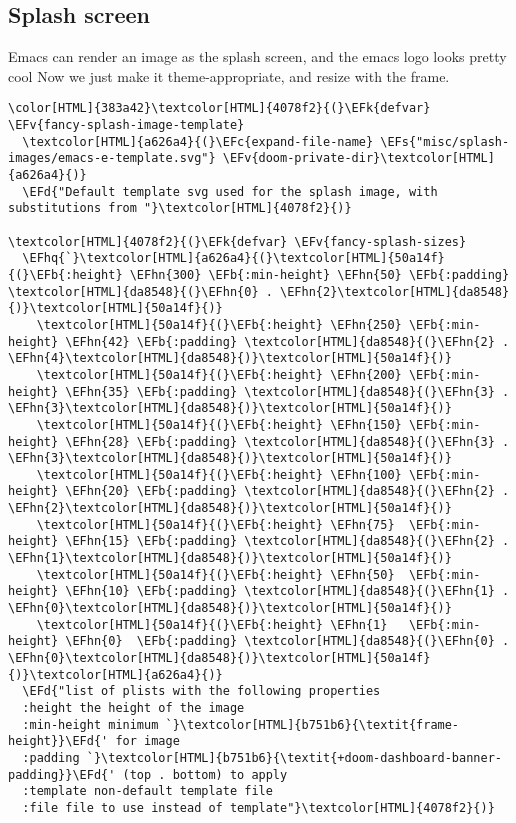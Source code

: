 \documentclass{scrartcl}
\newcommand{\EFk}[1]{\textcolor{EFk}{#1}} %
\newcommand{\EFd}[1]{\textcolor{EFd}{\textit{#1}}} %
\newcommand{\EFs}[1]{\textcolor{EFs}{#1}} %
\newcommand{\EFb}[1]{\textcolor{EFb}{#1}} %
\newcommand{\EFc}[1]{\textcolor{EFc}{#1}} %
\newcommand{\EFv}[1]{\textcolor{EFv}{#1}} %
\newcommand{\EFhn}[1]{\textcolor{EFhn}{\textbf{#1}}} %
\newcommand{\EFhq}[1]{\textcolor{EFhq}{#1}} %
\begin{document}
\subsection{Splash screen}
\label{sec:orgf0f228f}
Emacs can render an image as the splash screen, and the emacs logo looks pretty cool
Now we just make it theme-appropriate, and resize with the frame.
\begin{Code}
\begin{Verbatim}[]
\color[HTML]{383a42}\textcolor[HTML]{4078f2}{(}\EFk{defvar} \EFv{fancy-splash-image-template}
  \textcolor[HTML]{a626a4}{(}\EFc{expand-file-name} \EFs{"misc/splash-images/emacs-e-template.svg"} \EFv{doom-private-dir}\textcolor[HTML]{a626a4}{)}
  \EFd{"Default template svg used for the splash image, with substitutions from "}\textcolor[HTML]{4078f2}{)}

\textcolor[HTML]{4078f2}{(}\EFk{defvar} \EFv{fancy-splash-sizes}
  \EFhq{`}\textcolor[HTML]{a626a4}{(}\textcolor[HTML]{50a14f}{(}\EFb{:height} \EFhn{300} \EFb{:min-height} \EFhn{50} \EFb{:padding} \textcolor[HTML]{da8548}{(}\EFhn{0} . \EFhn{2}\textcolor[HTML]{da8548}{)}\textcolor[HTML]{50a14f}{)}
    \textcolor[HTML]{50a14f}{(}\EFb{:height} \EFhn{250} \EFb{:min-height} \EFhn{42} \EFb{:padding} \textcolor[HTML]{da8548}{(}\EFhn{2} . \EFhn{4}\textcolor[HTML]{da8548}{)}\textcolor[HTML]{50a14f}{)}
    \textcolor[HTML]{50a14f}{(}\EFb{:height} \EFhn{200} \EFb{:min-height} \EFhn{35} \EFb{:padding} \textcolor[HTML]{da8548}{(}\EFhn{3} . \EFhn{3}\textcolor[HTML]{da8548}{)}\textcolor[HTML]{50a14f}{)}
    \textcolor[HTML]{50a14f}{(}\EFb{:height} \EFhn{150} \EFb{:min-height} \EFhn{28} \EFb{:padding} \textcolor[HTML]{da8548}{(}\EFhn{3} . \EFhn{3}\textcolor[HTML]{da8548}{)}\textcolor[HTML]{50a14f}{)}
    \textcolor[HTML]{50a14f}{(}\EFb{:height} \EFhn{100} \EFb{:min-height} \EFhn{20} \EFb{:padding} \textcolor[HTML]{da8548}{(}\EFhn{2} . \EFhn{2}\textcolor[HTML]{da8548}{)}\textcolor[HTML]{50a14f}{)}
    \textcolor[HTML]{50a14f}{(}\EFb{:height} \EFhn{75}  \EFb{:min-height} \EFhn{15} \EFb{:padding} \textcolor[HTML]{da8548}{(}\EFhn{2} . \EFhn{1}\textcolor[HTML]{da8548}{)}\textcolor[HTML]{50a14f}{)}
    \textcolor[HTML]{50a14f}{(}\EFb{:height} \EFhn{50}  \EFb{:min-height} \EFhn{10} \EFb{:padding} \textcolor[HTML]{da8548}{(}\EFhn{1} . \EFhn{0}\textcolor[HTML]{da8548}{)}\textcolor[HTML]{50a14f}{)}
    \textcolor[HTML]{50a14f}{(}\EFb{:height} \EFhn{1}   \EFb{:min-height} \EFhn{0}  \EFb{:padding} \textcolor[HTML]{da8548}{(}\EFhn{0} . \EFhn{0}\textcolor[HTML]{da8548}{)}\textcolor[HTML]{50a14f}{)}\textcolor[HTML]{a626a4}{)}
  \EFd{"list of plists with the following properties
  :height the height of the image
  :min-height minimum `}\textcolor[HTML]{b751b6}{\textit{frame-height}}\EFd{' for image
  :padding `}\textcolor[HTML]{b751b6}{\textit{+doom-dashboard-banner-padding}}\EFd{' (top . bottom) to apply
  :template non-default template file
  :file file to use instead of template"}\textcolor[HTML]{4078f2}{)}


\end{Verbatim}
\end{Code}
\end{document}
